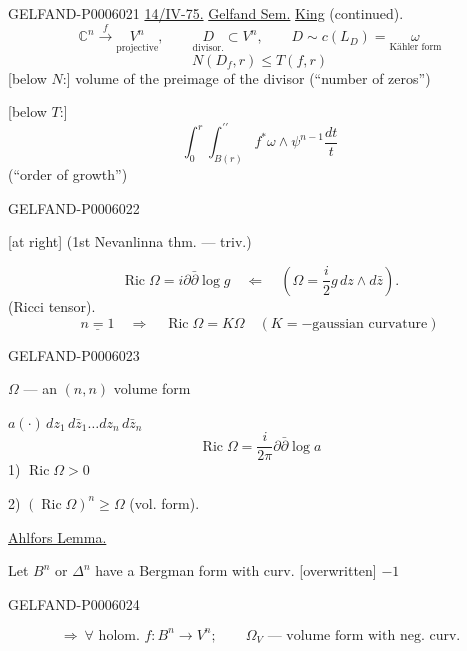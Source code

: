 \begin{GelfandAdjacentEvidence}{GELFAND-P000602}{1}
\underline{14/IV-75.} \underline{Gelfand Sem.} \underline{King} (continued).
\[
\mathbb C^n\xrightarrow{f}\underset{\text{projective}}{V^n},\qquad
\underset{\text{divisor.}}{D}\subset V^n,\qquad
D\sim c(L_D)=\underset{\text{Kähler form}}{\omega}
\]
\[
N(D_f,r)\le T(f,r)
\]
[below \(N\):] volume of the preimage of the divisor (``number of zeros'')

[below \(T\):]
\[
\int_0^r\int_{B(r)}^{\prime\prime} f^*\omega\wedge\psi^{n-1}\frac{dt}{t}
\]
(``order of growth'')
\end{GelfandAdjacentEvidence}
\begin{GelfandAdjacentEvidence}{GELFAND-P000602}{2}


[at right] (1st Nevanlinna thm. — triv.)

\[
\operatorname{Ric}\Omega=i\partial\bar\partial\log g
\quad\Leftarrow\quad \left(\Omega=\frac i2 g\,dz\wedge d\bar z\right).
\]
(Ricci tensor).
\[
\underline{n=1}\quad\Rightarrow\quad\operatorname{Ric}\Omega=K\Omega
\quad(K=-\text{gaussian curvature})
\]
\end{GelfandAdjacentEvidence}
\begin{GelfandAdjacentEvidence}{GELFAND-P000602}{3}


\(\Omega\) — an \((n,n)\) volume form

\hfill\(a(\cdot)\,dz_1\,d\bar z_1\ldots dz_n\,d\bar z_n\)
\[
\operatorname{Ric}\Omega=\frac i{2\pi}\partial\bar\partial\log a
\]
1) \(\operatorname{Ric}\Omega>0\)

2) \((\operatorname{Ric}\Omega)^n\ge\Omega\) (vol. form).

\underline{Ahlfors Lemma.}

Let \(B^n\) or \(\Delta^n\) have a Bergman form with curv. [overwritten] \(-1\)
\end{GelfandAdjacentEvidence}
\begin{GelfandAdjacentEvidence}{GELFAND-P000602}{4}

\[
\Rightarrow\ \forall\text{ holom. } f:B^n\to V^n;\qquad
\Omega_V\text{ — volume form with neg. curv.}
\]
\end{GelfandAdjacentEvidence}
